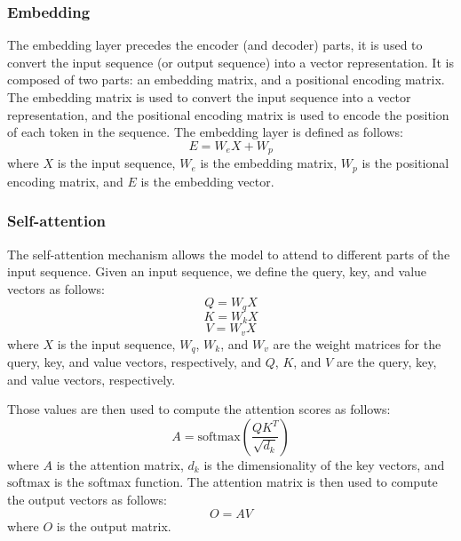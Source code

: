 \documentclass[a4paper]{sapthesis}
\begin{document}
\subsubsection{Embedding}
The embedding layer precedes the encoder (and decoder) parts, it is used to convert 
the input sequence (or output sequence) into a vector
 representation. It is composed of two parts: an 
 embedding matrix, and a positional encoding matrix. The embedding matrix
  is used to convert the input sequence into a vector representation, and
   the positional encoding matrix is used to encode the position of each 
   token in the sequence. The embedding layer is defined as follows:
   \begin{equation}
     E = W_eX + W_p
     \end{equation}
where $X$ is the input sequence, $W_e$ is the embedding matrix, $W_p$ is the
 positional encoding matrix, and $E$ is the embedding vector.
\subsubsection{Self-attention}
The self-attention mechanism allows the model to 
attend to different parts of the input sequence. Given an input sequence,
we define the query, key, and value vectors as follows:
\begin{equation}
  Q = W_qX
  \end{equation}
\begin{equation}
  K = W_kX
  \end{equation}
\begin{equation}
  V = W_vX
  \end{equation}
where $X$ is the input sequence, $W_q$, $W_k$, and $W_v$ are the weight
  matrices for the query, key, and value vectors, respectively, and $Q$,
  $K$, and $V$ are the query, key, and value vectors, respectively. 
  
  Those values are then used to compute the attention scores as follows:
  \begin{equation}
    A = \text{softmax}\left(\frac{QK^T}{\sqrt{d_k}}\right)
    \end{equation}
where $A$ is the attention matrix, $d_k$ is the dimensionality of the
  key vectors, and $\text{softmax}$ is the softmax function. The 
  attention matrix is then used to compute the output vectors as follows:
  \begin{equation}
    O = AV
    \end{equation}
where $O$ is the output matrix. 
\end{document}
